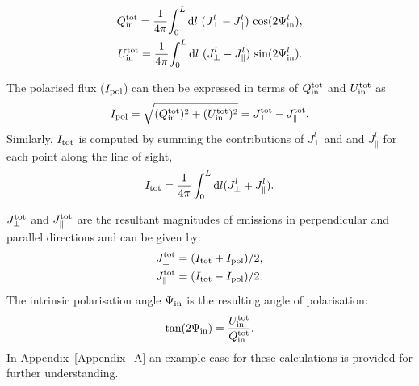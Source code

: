 \documentclass[usenatbib]{mnras}
\begin{document}
\begin{eqnarray}
Q_{\rm in}^{\rm tot} = \frac{1}{4\pi} {\int_0^L \mathrm{d}l \ ({J_{\perp}^l} - J_{\parallel}^l) \ {\cos}(2\Psi^l_{\rm in}) }, \\
U_{\rm in}^{\rm tot} =\frac{1}{4\pi} {\int_0^L \mathrm{d}l \ ({J_{\perp}^l} - J_{\parallel}^l) \ {\sin}(2\Psi^l_{\rm in})}.
\end{eqnarray}

The polarised flux ($I_{\rm pol}$) can then be expressed in terms of ${Q_{\rm in}^{\rm tot}}$ and ${U_{\rm in}^{\rm tot}}$ as
\begin{eqnarray} \label{eq_I_pol}
I_{\rm pol} = \sqrt{(Q_{\rm in}^{\rm tot})^2+(U_{\rm in}^{\rm tot})^2} = J_{\perp}^{\rm tot} - J_{\parallel}^{\rm tot}.
\end{eqnarray}
Similarly, $I_{\rm tot}$ is computed by summing the contributions of $J_{\perp}^l$ and and $J_{\parallel}^l$ for each point along the line of sight,
\begin{equation} \label{eq_I_tot}
    I_{\rm tot} = \frac{1}{4\pi} \int_0^L \mathrm{d}l (J_{\perp}^l + J_{\parallel}^l).
\end{equation}

$J_{\perp}^{\rm tot}$ and $J_{\parallel}^{\rm tot}$ are the resultant magnitudes of emissions in perpendicular and parallel directions and can be given by:
\begin{eqnarray}
J_{\perp}^{\rm tot} = (I_{\rm tot} + I_{\rm pol})/2, \\
J_{\parallel}^{\rm tot} = (I_{\rm tot} - I_{\rm pol})/2. 
\end{eqnarray}
The intrinsic polarisation angle $\Psi_{\rm in}$ is the resulting angle of polarisation:
\begin{eqnarray}
\tan(2\Psi_{\rm in}) = \frac{U_{\rm in}^{\rm tot}}{Q_{\rm in}^{\rm tot}}. 
\end{eqnarray}
In Appendix~\ref{Appendix_A} an example case for these calculations is provided for further understanding.

\end{document}
